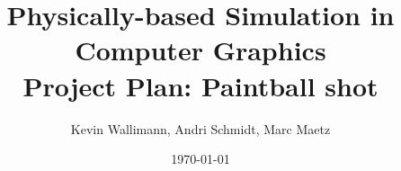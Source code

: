 \documentclass[10pt,a5paper,twoside]{memoir}
\title{\Huge Physically-based Simulation in Computer Graphics\\\vspace{1em}
Project Plan: Paintball shot
}
\author{\LARGE Kevin Wallimann, Andri Schmidt, Marc Maetz}
\date{\vspace{1em}\today}
\begin{document}
 

\begin{titlingpage}
\maketitle
\end{titlingpage}







%




\end{document}
